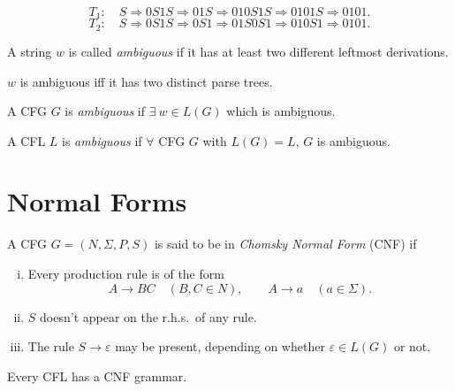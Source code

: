 \[
T_1:\quad S \Rightarrow 0S1S \Rightarrow 01S \Rightarrow 010S1S \Rightarrow 0101S \Rightarrow 0101.
\]
\[
T_2:\quad S \Rightarrow 0S1S \Rightarrow 0S1 \Rightarrow 01S0S1 \Rightarrow 0 1 0 S 1 \Rightarrow 0101.
\]

\begin{greybox}
\begin{definition}
A string $w$ is called \emph{ambiguous} if it has at least two different leftmost derivations.
\end{definition}
\end{greybox}

\begin{blackbox}
\begin{lemma}
$w$ is ambiguous iff it has two distinct parse trees.
\end{lemma}
\end{blackbox}

\begin{greybox}
\begin{definition}
A CFG $G$ is \emph{ambiguous} if $\exists\ w \in L(G)$ which is ambiguous.

A CFL $L$ is \emph{ambiguous} if $\forall$ CFG $G$ with $L(G) = L$, $G$ is ambiguous.
\end{definition}
\end{greybox}

\section{Normal Forms}

\begin{greybox}
\begin{definition}
A CFG $G = (N, \Sigma, P, S)$ is said to be in \emph{Chomsky Normal Form} (CNF) if
\begin{enumerate}[(i)]
    \item Every production rule is of the form
    \[
    A \to BC \quad (B, C \in N), \qquad A \to a \quad (a \in \Sigma).
    \]
    \item $S$ doesn't appear on the r.h.s.\ of any rule.
    \item The rule $S \to \varepsilon$ may be present, depending on whether $\varepsilon \in L(G)$ or not.
\end{enumerate}
\end{definition}
\end{greybox}

\begin{blackbox}
\begin{theorem}
Every CFL has a CNF grammar.
\end{theorem}
\end{blackbox}

